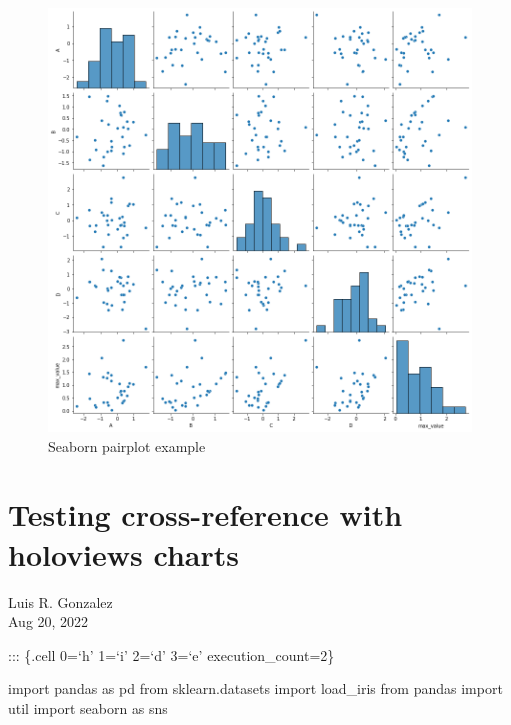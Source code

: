 \documentclass[
  letterpaper,
  DIV=11,
  numbers=noendperiod]{scrreport}
\newenvironment{Shaded}{\begin{snugshade}}{\end{snugshade}}
\newcommand{\ImportTok}[1]{\textcolor[rgb]{0.00,0.46,0.62}{#1}}
\newcommand{\NormalTok}[1]{\textcolor[rgb]{0.00,0.23,0.31}{#1}}
\begin{document}
\begin{figure}

{\centering \includegraphics{./testing_files/figure-pdf/fig-pairplot-output-1.png}

}

\caption{\label{fig-pairplot}Seaborn pairplot example}

\end{figure}


\hypertarget{testing-cross-reference-with-holoviews-charts-1}{%
\chapter{Testing cross-reference with holoviews
charts}\label{testing-cross-reference-with-holoviews-charts-1}}

Luis R. Gonzalez\\
Aug 20, 2022

\hfill\break

::: \{.cell 0=`h' 1=`i' 2=`d' 3=`e' execution\_count=2\}

\begin{Shaded}
\begin{Highlighting}[]
\ImportTok{import}\NormalTok{ pandas }\ImportTok{as}\NormalTok{ pd}
\ImportTok{from}\NormalTok{ sklearn.datasets }\ImportTok{import}\NormalTok{ load\_iris}
\ImportTok{from}\NormalTok{ pandas }\ImportTok{import}\NormalTok{ util}
\ImportTok{import}\NormalTok{ seaborn }\ImportTok{as}\NormalTok{ sns}
\end{Highlighting}
\end{Shaded}
\end{document}
